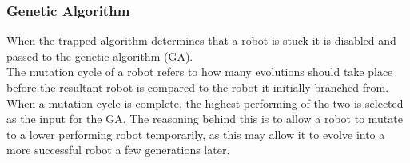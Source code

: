 \documentclass{article}
\begin{document}
\subsubsection{Genetic Algorithm}
\label{sec:GA Imp}
When the trapped algorithm determines that a robot is stuck it is disabled and passed to the genetic algorithm (GA).\\

The mutation cycle of a robot refers to how many evolutions should take place before the resultant robot is compared to the robot it initially branched from. When a mutation cycle is complete, the highest performing of the two is selected as the input for the GA. The reasoning behind this is to allow a robot to mutate to a lower performing robot temporarily, as this may allow it to evolve into a more successful robot a few generations later.\\
\end{document}
